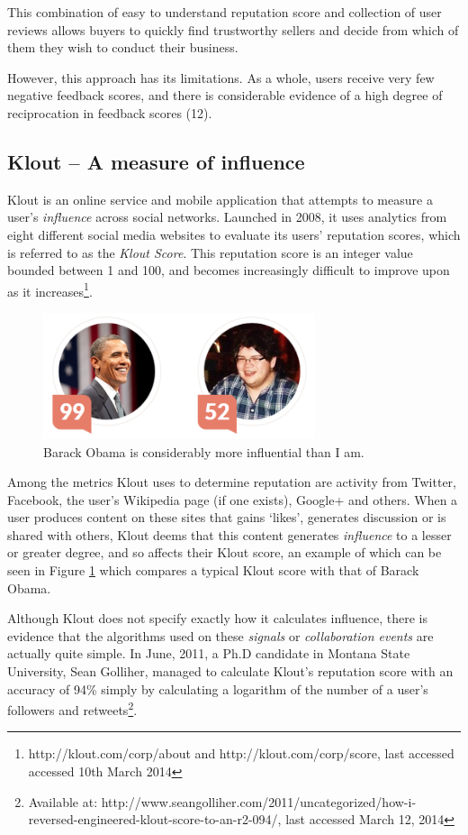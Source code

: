 \documentclass[]{final_report}
\begin{document}
This combination of easy to understand reputation score and collection of user reviews allows buyers to quickly find trustworthy sellers and decide from which of them they wish to conduct their business.

However, this approach has its limitations. As a whole, users receive very few negative feedback scores, and there is considerable evidence of a high degree of reciprocation in feedback scores (12).

\subsection{Klout -- A measure of influence}

Klout is an online service and mobile application that attempts to measure a user's \textsl{influence} across social networks. Launched in 2008, it uses analytics from eight different social media websites to evaluate its users' reputation scores, which is referred to as the \textsl{Klout Score}. This reputation score is an integer value bounded between 1 and 100, and becomes increasingly difficult to improve upon as it increases\footnote{http://klout.com/corp/about and http://klout.com/corp/score, last accessed accessed 10th March 2014}.

\begin{figure}[ht!]
\centering
\includegraphics[width=80mm]{chap2/klout.png}
\caption{Barack Obama is considerably more influential than I am.}
\label{gra:klout}
\end{figure}

Among the metrics Klout uses to determine reputation are activity from Twitter, Facebook, the user's Wikipedia page (if one exists), Google+ and others. When a user produces content on these sites that gains `likes', generates discussion or is shared with others, Klout deems that this content generates \textsl{influence} to a lesser or greater degree, and so affects their Klout score, an example of which can be seen in Figure \ref{gra:klout} which compares a typical Klout score with that of Barack Obama.

Although Klout does not specify exactly how it calculates influence, there is evidence that the algorithms used on these \textsl{signals} or \textsl{collaboration events} are actually quite simple. In June, 2011, a Ph.D candidate in Montana State University, Sean Golliher, managed to calculate Klout's reputation score with an accuracy of 94\% simply by calculating a logarithm of the number of a user's followers and retweets\footnote{Available at: http://www.seangolliher.com/2011/uncategorized/how-i-reversed-engineered-klout-score-to-an-r2-094/, last accessed March 12, 2014}.
\end{document}
